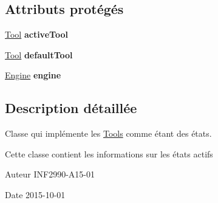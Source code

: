 \subsection*{Attributs protégés}
\begin{DoxyCompactItemize}
\item 
\hypertarget{class_interface_graphique_1_1_tools_1_1_tool_context_a981402115b53b8c35505f7a727eb878b}{\hyperlink{class_interface_graphique_1_1_tools_1_1_tool}{Tool} {\bfseries active\-Tool}}\label{class_interface_graphique_1_1_tools_1_1_tool_context_a981402115b53b8c35505f7a727eb878b}

\item 
\hypertarget{class_interface_graphique_1_1_tools_1_1_tool_context_a20bd28b2a8604546174317761372a6e9}{\hyperlink{class_interface_graphique_1_1_tools_1_1_tool}{Tool} {\bfseries default\-Tool}}\label{class_interface_graphique_1_1_tools_1_1_tool_context_a20bd28b2a8604546174317761372a6e9}

\item 
\hypertarget{class_interface_graphique_1_1_tools_1_1_tool_context_ae4269a6c57a0a56c9ed2af09d1354697}{\hyperlink{class_interface_graphique_1_1_engine}{Engine} {\bfseries engine}}\label{class_interface_graphique_1_1_tools_1_1_tool_context_ae4269a6c57a0a56c9ed2af09d1354697}

\end{DoxyCompactItemize}


\subsection{Description détaillée}
Classe qui implémente les \hyperlink{namespace_interface_graphique_1_1_tools}{Tools} comme étant des états. 

Cette classe contient les informations sur les états actifs

\begin{DoxyAuthor}{Auteur}
I\-N\-F2990-\/\-A15-\/01 
\end{DoxyAuthor}
\begin{DoxyDate}{Date}
2015-\/10-\/01 
\end{DoxyDate}


